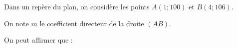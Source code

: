 
Dans un repère du plan, on considère les points $A(1 ; 100)$ et $B(4 ; 106)$.

On note $m$ le coefficient directeur de la droite $(A B)$.

On peut affirmer que :

\smallskip

